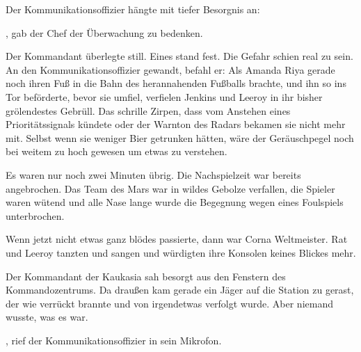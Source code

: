 \par

Der Kommunikationsoffizier hängte mit tiefer Besorgnis an: 

\par

, gab der Chef der Überwachung zu bedenken. 

\par

Der Kommandant überlegte still. Eines stand fest. Die Gefahr schien real zu sein. An den Kommunikationsoffizier gewandt, befahl er: 
\ortswechsel
Als Amanda Riya gerade noch ihren Fuß in die Bahn des herannahenden Fußballs brachte, und ihn so ins Tor beförderte, bevor sie umfiel, verfielen Jenkins und Leeroy in ihr bisher grölendestes Gebrüll. Das schrille Zirpen, dass vom Anstehen eines Prioritätssignals kündete oder der Warnton des Radars bekamen sie nicht mehr mit. Selbst wenn sie weniger Bier getrunken hätten, wäre der Geräuschpegel noch bei weitem zu hoch gewesen um etwas zu verstehen.

\par

Es waren nur noch zwei Minuten übrig. Die Nachspielzeit war bereits angebrochen. Das Team des Mars war in wildes Gebolze verfallen, die Spieler waren wütend und alle Nase lange wurde die Begegnung wegen eines Foulspiels unterbrochen.

\par

Wenn jetzt nicht etwas ganz blödes passierte, dann war Corna Weltmeister. Rat und Leeroy tanzten und sangen und würdigten ihre Konsolen keines Blickes mehr.

\par

Der Kommandant der Kaukasia sah besorgt aus den Fenstern des Kommandozentrums. Da draußen kam gerade ein Jäger auf die Station zu gerast, der wie verrückt brannte und von irgendetwas verfolgt wurde. Aber niemand wusste, was es war.

\par

, rief der Kommunikationsoffizier in sein Mikrofon.

